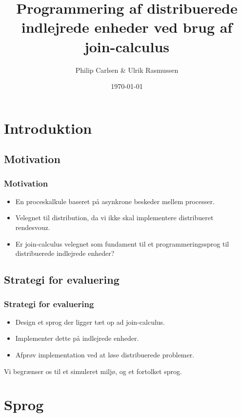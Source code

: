 \documentclass{beamer}
\title{Programmering af distribuerede indlejrede enheder ved brug af join-calculus}
\author{Philip Carlsen \& Ulrik Rasmussen}
\institute{\textrm{Datalogisk Institut, Københavns Universitet}}
\date{\today}
\begin{document}
\frame{\titlepage}

\section{Introduktion}

\subsection{Motivation}

\begin{frame}
\frametitle{Motivation}

\begin{itemize}
\item
    En proceskalkule baseret på asynkrone beskeder mellem processer.

\item
    Velegnet til distribution, da vi ikke skal implementere distribueret rendesvouz.

\item
    Er join-calculus velegnet som fundament til et programmeringssprog til
    distribuerede indlejrede enheder?   
\end{itemize}
\end{frame}


\subsection{Strategi for evaluering}

\begin{frame}
\frametitle{Strategi for evaluering}

\begin{itemize}
 \item Design et sprog der ligger tæt op ad join-calculus.
 \item Implementer dette på indlejrede enheder.
 \item Afprøv implementation ved at løse distribuerede problemer.
\end{itemize}

Vi begrænser os til et simuleret miljø, og et fortolket sprog.

\end{frame}


\section{Sprog}
\end{document}

